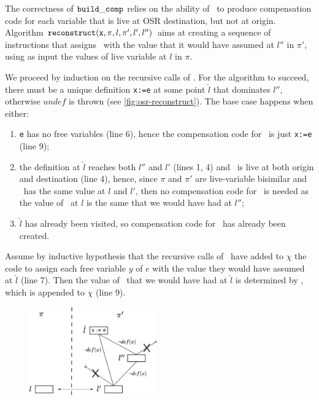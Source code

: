 \begin{myproof}
The correctness of ${\tt build\_comp}$ relies on the ability of \reconstruct\ to produce compensation code for each variable that is live at OSR destination, but not at origin. Algorithm $\text{${\tt reconstruct}$}(\text{${\tt x}$}, \pi, l, \pi', l', l'')$ aims at creating a sequence of instructions that assigns \wx\ with the value that it would have assumed at $l''$ in $\pi'$, using as input the values of live variable at $l$ in $\pi$.

We proceed by induction on the recursive calls of \reconstruct. For the algorithm to succeed, there must be a unique definition {\tt x:=e} at some point $\hat{l}$ that dominates $l''$, otherwise $undef$ is thrown (see \myfigure\ref{fig:osr-reconstruct}). %
The base case happens when either:
\begin{enumerate}[itemsep=3pt, parsep=0pt]
 \item {\tt e} has no free variables (line 6), hence the compensation code for \wx\ is just {\tt x:=e} (line 9);
 \item the definition at $\hat{l}$ reaches both $l''$ and $l'$ (lines 1, 4) and \wx\ is live at both origin and destination (line 4), hence, since $\pi$ and $\pi'$ are live-variable bisimilar and \wx\ has the same value at $l$ and $l'$, then no compensation code for \wx\ is needed as the value of \wx\ at $l$ is the same that we would have had at $l''$;
 \item $\hat{l}$ has already been visited, so compensation code for \wx\ has already been created.
\end{enumerate}

\noindent Assume by inductive hypothesis that the recursive calls of \reconstruct\ have added to $\chi$ the code to assign each free variable $y$ of $e$ with the value they would have assumed at $\hat{l}$ (line 7). Then the value of \wx\ that we would have had at $\hat{l}$ is determined by , which is appended to $\chi$ (line 9).
\end{myproof}

\ifdefined\noauthorea
\begin{figure}[!ht]
\begin{center}
\includegraphics[width=0.49\textwidth]{figures/osr-reconstruct/osr-reconstruct.eps}
\caption{\protect}
\end{center}
\end{figure}
\fi

